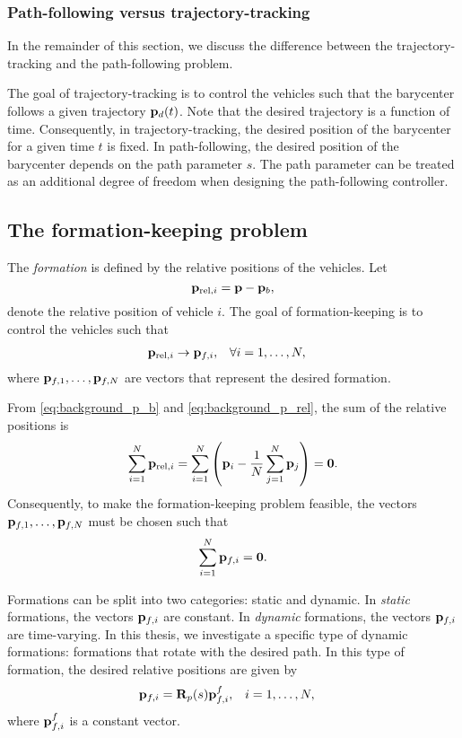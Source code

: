\subsubsection{Path-following versus trajectory-tracking}
In the remainder of this section, we discuss the difference between the trajectory-tracking and the path-following problem.

The goal of trajectory-tracking is to control the vehicles such that the barycenter follows a given trajectory $\mathbf{p}_d(t)$.
Note that the desired trajectory is a function of time.
Consequently, in trajectory-tracking, the desired position of the barycenter for a given time $t$ is fixed.
In path-following, the desired position of the barycenter depends on the path parameter $s$.
The path parameter can be treated as an additional degree of freedom when designing the path-following controller.

\subsection{The formation-keeping problem}
The \emph{formation} is defined by the relative positions of the vehicles.
Let
\begin{equation}
    \mathbf{p}_{{\rm rel}, i} = \mathbf{p} - \mathbf{p}_b,
    \label{eq:background_p_rel}
\end{equation}
denote the relative position of vehicle $i$.
The goal of formation-keeping is to control the vehicles such that
\begin{align}
    &\mathbf{p}_{{\rm rel}, i} \rightarrow \mathbf{p}_{f, i}, &
    & \forall i = 1, \ldots, N,
\end{align}
where $\mathbf{p}_{f, 1}, \ldots, \mathbf{p}_{f, N}$ are vectors that represent the desired formation.

From \eqref{eq:background_p_b} and \eqref{eq:background_p_rel}, the sum of the relative positions is
\begin{equation}
    \sum_{i=1}^N \mathbf{p}_{{\rm rel}, i} = \sum_{i=1}^N \left(\mathbf{p}_i - \frac{1}{N}\sum_{j=1}^N \mathbf{p}_j \right) = \mathbf{0}.
\end{equation}
Consequently, to make the formation-keeping problem feasible, the vectors $\mathbf{p}_{f, 1}, \ldots, \mathbf{p}_{f, N}$ must be chosen such that
\begin{equation}
    \sum_{i=1}^N \mathbf{p}_{f, i} = \mathbf{0}.
\end{equation}

Formations can be split into two categories: static and dynamic.
In \emph{static} formations, the vectors $\mathbf{p}_{f, i}$ are constant.
In \emph{dynamic} formations, the vectors $\mathbf{p}_{f, i}$ are time-varying.
In this thesis, we investigate a specific type of dynamic formations: formations that rotate with the desired path.
In this type of formation, the desired relative positions are given by
\begin{align}
    \mathbf{p}_{f, i} &= \mathbf{R}_p(s) \mathbf{p}_{f, i}^f,&
    i &= 1, \ldots, N,
\end{align}
where $\mathbf{p}_{f, i}^f$ is a constant vector.

